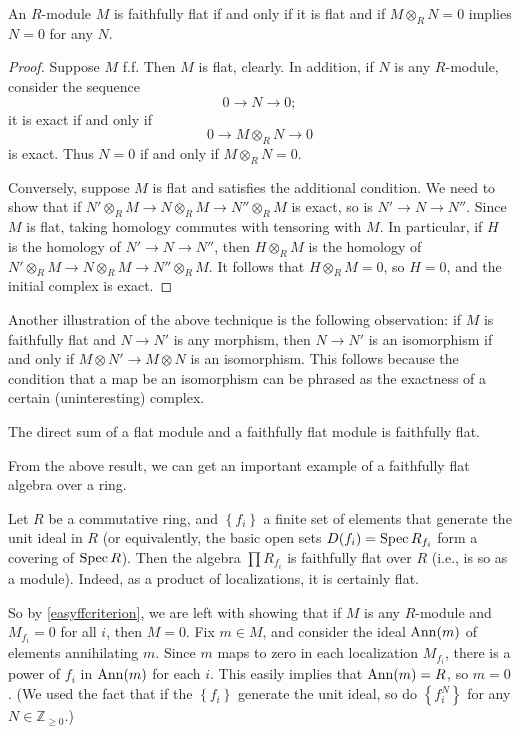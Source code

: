 \begin{proposition}  \label{easyffcriterion}
An $R$-module $M$ is faithfully flat if and only if it is flat and if $M
\otimes_R N = 0$ implies $N=0$ for any $N$.
\end{proposition} 
\begin{proof} Suppose $M$ f.f.
Then $M$ is flat, clearly. In addition, if $N$ is any $R$-module, consider the
sequence
\[ 0 \to N \to 0;  \]
it is exact if and only if
\[ 0 \to M \otimes_R N \to 0  \]
is exact. Thus $N=0$ if and only if $M \otimes_R N = 0$.

Conversely, suppose $M$ is flat and satisfies the additional condition. We
need to show that if $N'
\otimes_R M \to N \otimes_R M \to N'' \otimes_R M$ is exact, so is $N' \to N
\to N''$. Since $M$ is flat, taking homology commutes with tensoring with $M$.
In particular, if $H$ is the homology of $N' \to N \to N''$, then $H \otimes_R
M$ is the homology of 
$N'
\otimes_R M \to N \otimes_R M \to N'' \otimes_R M$. It follows that $H
\otimes_R M = 0$, so $H=0$, and the initial complex is exact.
\end{proof} 

\begin{example} 
Another illustration of the above technique is the following observation: if
$M$ is faithfully flat and $N \to N'$ is any morphism, then $N \to N'$ is an
isomorphism if and only if $M \otimes N' \to M \otimes N$ is an isomorphism.
This follows because the condition that a map be an isomorphism can be phrased
as the exactness of a certain (uninteresting) complex.
\end{example} 
\begin{exercise} 
The direct sum of a flat module and a faithfully flat module is faithfully flat.
\end{exercise} 


From the above result, we can get an important example of a faithfully flat
algebra over a ring.
\begin{example} 
Let $R$ be a commutative ring, and $\left\{f_i\right\}$ a finite set of
elements that generate the unit ideal in $R$ (or equivalently, the basic open
sets $D(f_i) = \operatorname{Spec} R_{f_i}$ form a covering of $\operatorname{Spec} R$). 
Then the algebra $\prod R_{f_i}$ is faithfully flat over $R$ (i.e., is so as a
module). Indeed, as a
product of localizations, it is certainly flat.

So by \cref{easyffcriterion}, we are left with showing that if $M$ is any
$R$-module and $M_{f_i} =0 $ for all $i$, then $M = 0$. 
Fix $m \in M$, and consider the ideal $\operatorname{Ann}(m)$ of elements annihilating $m$.
Since $m$ maps to zero in each localization $M_{f_i}$, there is a power of
$f_i$ in $\operatorname{Ann}(m)$ for each $i$. 
This easily implies that $\operatorname{Ann}(m) = R$, so $m=0$. (We used the fact that if the
$\left\{f_i\right\}$ generate the unit ideal, so do $\left\{f_i^N\right\}$ for
any $N \in \mathbb{Z}_{\geq 0}$.)
\end{example} 

